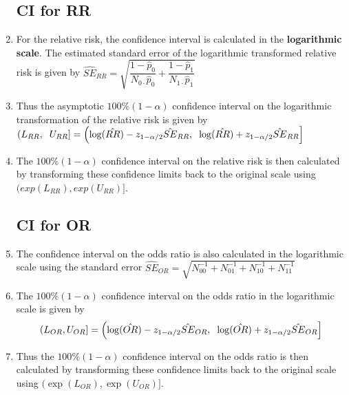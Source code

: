 \begin{enumerate}[itemsep=0.2cm]
    \subsection*{CI for RR \cite{ism-1}}

    \item For the relative risk, the confidence interval is calculated in the \textbf{logarithmic scale}. The estimated standard error of the logarithmic transformed relative risk is given by
    $
        \hat{SE}_{RR}
        = \sqrt{
            \dfrac{1 - \hat{p}_0}{N_{0\cdot}\hat{p}_0}
            + \dfrac{1 - \hat{p}_1}{N_{1\cdot}\hat{p}_1}
        }
    $

    \item Thus the asymptotic $100\%(1 - \alpha)$ confidence interval on the logarithmic transformation of the relative risk is given by
    $
        (L_{RR}, \hspace{0.2cm} U_{RR}]
        = \left( 
            \log(\hat{RR}) - z_{1 - \alpha/2} \hat{SE}_{RR},
            \hspace{0.2cm}
            \log(\hat{RR}) + z_{1 - \alpha/2} \hat{SE}_{RR}
        \right]
    $

    \item The $100\%(1 - \alpha)$ confidence interval on the relative risk is then calculated by transforming these confidence limits back to the original scale using $(exp(L _{RR}), exp(U_{RR})]$.

    \subsection*{CI for OR \cite{ism-1}}

    \item The confidence interval on the odds ratio is also calculated in the logarithmic scale using the standard error $
        \hat{SE}_{OR}
        = \sqrt{N^{-1}_{00} + N^{-1}_{01} + N^{-1}_{10} + N^{-1}_{11}}
    $

    \item The $100\%(1 - \alpha)$ confidence interval on the odds ratio in the logarithmic scale is given by
    \[
        (L _{O R}, U_{O R}]
        = \left(
            \log(\hat{OR}) - z_{1-\alpha/2} \hat{SE}_{O R}, 
            \hspace{0.2cm}
            \log(\hat{OR}) + z_{1-\alpha/2} \hat{SE}_{O R}
        \right]
    \]

    \item Thus the $100\%(1 - \alpha)$ confidence interval on the odds ratio is then calculated by transforming these confidence limits back to the original scale using $(\exp(L_{O R}), \exp (U_{O R})]$.
\end{enumerate}




